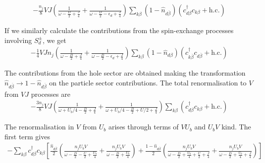 \documentclass[reprint,superscriptaddress,floatfix]{revtex4-2}
\begin{document}
\begin{widetext}
\begin{equation}\begin{aligned}
	-\frac{n_j}{8}V J \left(\frac{1}{\omega - \frac{D}{2} + \frac{J}{4}} + \frac{1}{\omega - \frac{D}{2} - \epsilon_d + \frac{J}{4}}\right) \sum_{k\beta}\left(1 - \hat n_{d\overline\beta}\right) \left(c^\dagger_{d\beta} c_{k\beta} + \text{h.c.}\right)
\end{aligned}\end{equation}

If we similarly calculate the contributions from the spin-exchange processes involving \(S_d^\pm\), we get
\begin{equation}\begin{aligned}
	-\frac{1}{4}V J n_j \left(\frac{1}{\omega - \frac{D}{2} + \frac{J}{4}} + \frac{1}{\omega - \frac{D}{2} - \epsilon_d + \frac{J}{4}}\right) \sum_{k\beta} \left(1 - \hat n_{d\beta}\right)  \left(c^\dagger_{k\overline\beta} c_{d\overline\beta} + \text{h.c.}\right)
\end{aligned}\end{equation}

The contributions from the hole sector are obtained making the transformation \(\hat n_{d\overline\beta} \to 1 - \hat n_{d\overline\beta}\) on the particle sector contributions. The total renormalisation to \(V\) from \(VJ\) processes are
\begin{equation}\begin{aligned}
	-\frac{3n_j}{8}V J \left(\frac{1}{\omega +U_b/4 - \frac{D}{2} + \frac{J}{4}} + \frac{1}{\omega +U_b/4 - \frac{D}{2} + U/2 + \frac{J}{4}}\right)\sum_{k\beta}\left(c^\dagger_{d\beta} c_{k\beta} + \text{h.c.}\right)
\end{aligned}\end{equation}

The renormalisation in \(V\) from \(U_b\) arises through terms of \(V U_b\) and \(U_b V\) kind. The first term gives
\begin{equation}\begin{aligned}
	-\sum_{k\beta} c^\dagger_{d\beta} c_{k\beta} \left[\frac{\hat n_{d\overline\beta}}{2}\left(\frac{n_jU_b V}{\omega - \frac{D}{2} - \frac{U}{2} + \frac{U_b}{4}} + \frac{n_jU_b V}{\omega - \frac{D}{2} + \frac{U_b}{4}}\right) + \frac{1-\hat n_{d\overline\beta}}{2}\left(\frac{n_jU_b V}{\omega - \frac{D}{2} + \frac{U_b}{4} + \frac{U}{2} + \frac{J}{4}} + \frac{n_jU_b V}{\omega - \frac{D}{2} + \frac{U_b}{4} + \frac{J}{4}}\right)\right]
\end{aligned}\end{equation}


\end{widetext}
\end{document}
